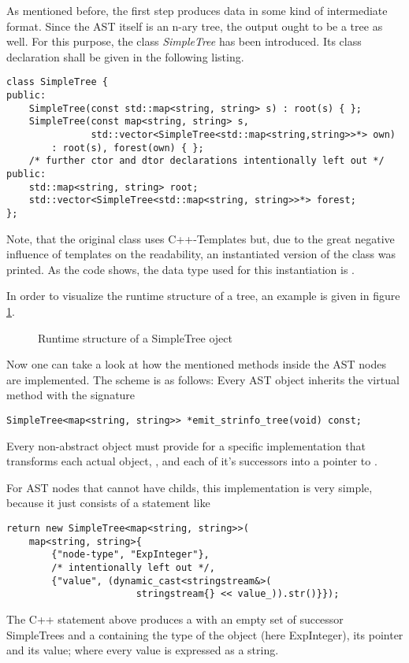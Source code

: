 As mentioned before, the first step produces data in some kind of
intermediate format. Since the AST itself is an n-ary tree, the output
ought to be a tree as well. For this purpose, the class
\emph{SimpleTree} has been introduced. Its class declaration shall be
given in the following listing.
%
\begin{lstlisting}[style=c++]
class SimpleTree {
public:
    SimpleTree(const std::map<string, string> s) : root(s) { };
    SimpleTree(const map<string, string> s,
               std::vector<SimpleTree<std::map<string,string>>*> own)
        : root(s), forest(own) { };
    /* further ctor and dtor declarations intentionally left out */
public:
    std::map<string, string> root;
    std::vector<SimpleTree<std::map<string, string>>*> forest;
};
\end{lstlisting}
%
Note, that the original class uses C++-Templates but, due to the great
negative influence of templates on the readability, an instantiated
version of the class was printed. As the code shows, the data type
used for this instantiation is .

In order to visualize the runtime structure of a 
tree, an example is given in figure \ref{fig:simpletree}.
%
\begin{figure}[tb]
    \centering
    \caption{Runtime structure of a SimpleTree oject}
    
    \label{fig:simpletree}
\end{figure}
%
Now one can take a look at how the mentioned methods inside the AST nodes
are implemented. The scheme is as follows: Every AST object inherits
the virtual method with the signature
%
\begin{lstlisting}[style=c++]
SimpleTree<map<string, string>> *emit_strinfo_tree(void) const;
\end{lstlisting}
%
Every non-abstract object must provide for a specific implementation
that transforms each actual object, , and each of it's
successors into a pointer to .

For AST nodes that cannot have childs, this implementation is very
simple, because it just consists of a statement like
%
\begin{lstlisting}[style=c++]
return new SimpleTree<map<string, string>>(
    map<string, string>{
        {"node-type", "ExpInteger"},
        /* intentionally left out */,
        {"value", (dynamic_cast<stringstream&>(
                       stringstream{} << value_)).str()}});
\end{lstlisting}
%
The C++ statement above produces a
with an empty set of successor SimpleTrees and a  containing
the type of the object (here ExpInteger), its pointer and its value;
where every value is expressed as a string.

